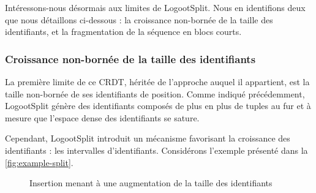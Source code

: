 Intéressons-nous désormais aux limites de LogootSplit.
Nous en identifions deux que nous détaillons ci-dessous : la croissance non-bornée de la taille des identifiants, et la fragmentation de la séquence en blocs courts.

\subsubsection{Croissance non-bornée de la taille des identifiants}

La première limite de ce \ac{CRDT}, héritée de l'approche auquel il appartient, est la taille non-bornée de ses identifiants de position.
Comme indiqué précédemment, LogootSplit génère des identifiants composés de plus en plus de tuples au fur et à mesure que l'espace dense des identifiants se sature.

Cependant, LogootSplit introduit un mécanisme favorisant la croissance des identifiants : les intervalles d'identifiants.
Considérons l'exemple présenté dans la \autoref{fig:example-split}.

\begin{figure}[!ht]

  \centering
  \caption{Insertion menant à une augmentation de la taille des identifiants}
  \label{fig:example-split}
\end{figure}

